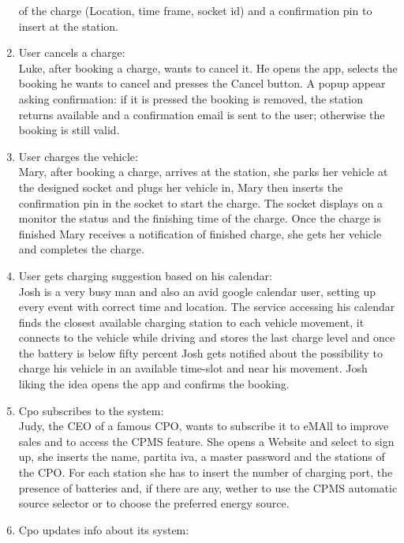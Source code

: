 \begin{enumerate}[label=\textbf{S\arabic*}]
            of the charge (Location, time frame, socket id) and a confirmation pin to insert at the station.
      \item User cancels a charge:\\
            Luke, after booking a charge, wants to cancel it. He opens the app, selects the booking he wants to cancel and presses the Cancel button. A popup appear asking confirmation: if it is pressed the booking is removed, the station returns available and a confirmation email is sent to the user; otherwise the booking is still valid.
      \item User charges the vehicle:\\
            Mary, after booking a charge, arrives at the station, she parks her vehicle at the designed socket
            and plugs her vehicle in, Mary then inserts the confirmation pin in the socket to start the charge.
            The socket displays on a monitor the status and the finishing time of the charge.
            Once the charge is finished Mary receives a notification of finished charge,
            she gets her vehicle and completes the charge.
      \item User gets charging suggestion based on his calendar:\\
            Josh is a very busy man and also an avid google calendar user,
            setting up every event with correct time and location.
            The service accessing his calendar finds the closest available charging station to each vehicle movement,
            it connects to the vehicle while driving and stores the last charge level and once the battery is below fifty percent Josh gets notified
            about the possibility to charge his vehicle in an available time-slot and near his movement.
            Josh liking the idea opens the app and confirms the booking.
      \item Cpo subscribes to the system:\\
            Judy, the CEO of a famous CPO, wants to subscribe it to eMAll to improve sales and to access the CPMS feature.
            She opens a Website and select to sign up, she inserts the name, partita iva, a master password and the stations of the CPO.
            For each station she has to insert the number of charging port, the presence of batteries and, if there are any,
            wether to use the CPMS automatic source selector or to choose the preferred energy source.
      \item Cpo updates info about its system:\\

\end{enumerate}
